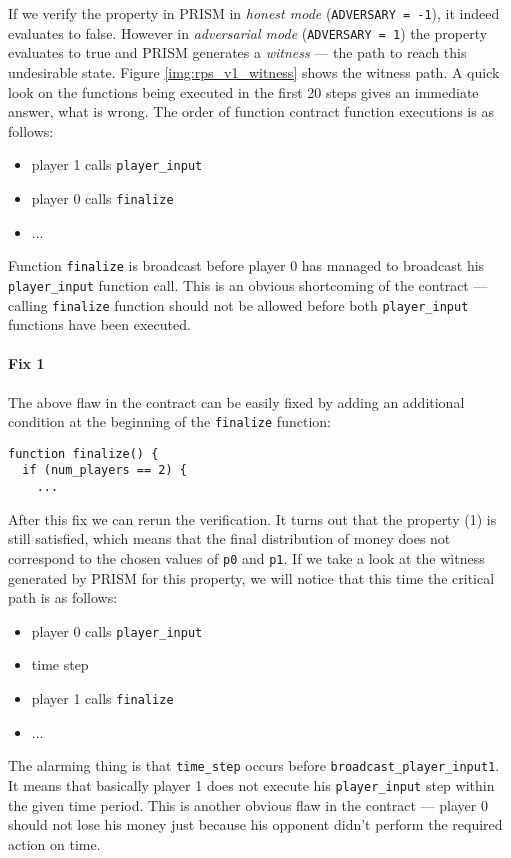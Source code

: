 If we verify the property in PRISM in \emph{honest mode} (\lstinline{ADVERSARY = -1}), it indeed evaluates to false.
However in \emph{adversarial mode} (\lstinline{ADVERSARY = 1}) the property evaluates to true and PRISM
generates a \emph{witness} --- the path to reach this undesirable state.
Figure \ref{img:rps_v1_witness} shows the witness path.
A quick look on the functions being executed in the first 20 steps gives an immediate answer, what is wrong.
The order of function contract function executions is as follows:
\begin{itemize}
\item player 1 calls \lstinline{player_input}
\item player 0 calls \lstinline{finalize}
\item ...
\end{itemize}

Function \lstinline{finalize} is broadcast before player 0 has managed to broadcast his \lstinline{player_input} 
function call.
This is an obvious shortcoming of the contract --- calling \lstinline{finalize} function should not be allowed
before both \lstinline{player_input} functions have been executed.

\paragraph{Fix 1} 

The above flaw in the contract can be easily fixed by adding an additional condition at the beginning of the 
\lstinline{finalize} function:
\begin{lstlisting}
function finalize() {
  if (num_players == 2) {
    ...
\end{lstlisting}

After this fix we can rerun the verification.
It turns out that the property (1) is still satisfied, which means that the final distribution of money does not correspond
to the chosen values of \lstinline{p0} and \lstinline{p1}.
If we take a look at the witness generated by PRISM for this property, we will notice that this time
the critical path is as follows:
\begin{itemize}
\item player 0 calls \lstinline{player_input}
\item time step
\item player 1 calls \lstinline{finalize}
\item ...
\end{itemize}
The alarming thing is that \lstinline{time_step} occurs before \lstinline{broadcast_player_input1}.
It means that basically player 1 does not execute his \lstinline{player_input} step within the given time period.
This is another obvious flaw in the contract --- player 0 should not lose his money just because his opponent
didn't perform the required action on time.

